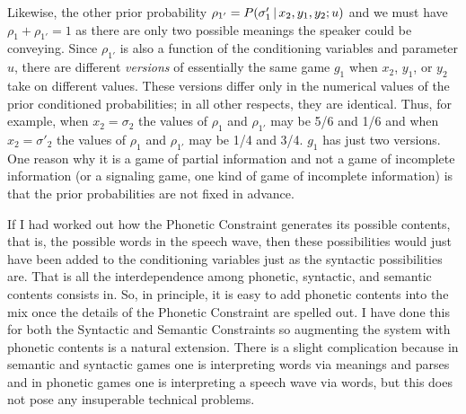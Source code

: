 Likewise, the other prior probability $\rho_{1'} = P(\sigma'_1 \,|\, x_2, y_1, y_2; u)$ and we must have $\rho_1 + \rho_{1'} = 1$ as there are only two possible meanings the speaker could be conveying. Since $\rho_{1'}$ is also a function of the conditioning variables and parameter $u$, there are different \emph{versions} of essentially the same game $g_1$ when $x_2$, $y_1$, or $y_2$ take on different values. These versions differ only in the numerical values of the prior conditioned probabilities; in all other respects, they are identical. Thus, for example, when $x_2 = \sigma_2$ the values of $\rho_{1}$ and $\rho_{1'}$ may be 5/6 and 1/6 and when $x_2 = \sigma'_2$ the values of $\rho_{1}$ and $\rho_{1'}$ may be 1/4 and 3/4. $g_1$ has just two versions. One reason why it is a game of partial information and not a game of incomplete information (or a signaling game, one kind of game of incomplete information) is that the prior probabilities are not fixed in advance.

If I had worked out how the Phonetic Constraint generates its possible contents, that is, the possible words in the speech wave, then these possibilities would just have been added to the conditioning variables just as the syntactic possibilities are. That is all the interdependence among phonetic, syntactic, and semantic contents consists in. So, in principle, it is easy to add phonetic contents into the mix once the details of the Phonetic Constraint are spelled out. I have done this for both the Syntactic and Semantic Constraints so augmenting the system with phonetic contents is a natural extension. There is a slight complication because in semantic and syntactic games one is interpreting words via meanings and parses and in phonetic games one is interpreting a speech wave via words, but this does not pose any insuperable technical problems.

